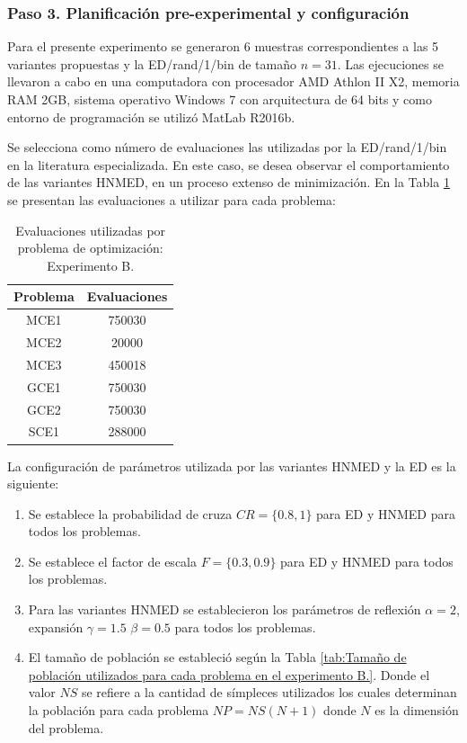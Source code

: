 \subsubsection{Paso 3. Planificación pre-experimental y configuración}
Para el presente experimento se generaron 6 muestras correspondientes a las 5 variantes propuestas y la  ED/rand/1/bin de tamaño $n=31$. Las ejecuciones se llevaron a cabo en una computadora con procesador AMD Athlon II X2, memoria RAM 2GB, sistema operativo Windows 7 con arquitectura de 64 bits y como entorno de programación se utilizó  MatLab R2016b. 

Se selecciona como número de evaluaciones las utilizadas por la ED/rand/1/bin en la literatura especializada. En este caso, se desea observar el comportamiento de las variantes HNMED, en un proceso extenso de minimización. En la Tabla \ref{tab:Evaluaciones utilizadas por problema de optimización: Experimento B.} se presentan las evaluaciones a utilizar para cada problema:

\begin{table}[h]
	\centering
	\caption{Evaluaciones utilizadas por problema de optimización: Experimento B.}
	\label{tab:Evaluaciones utilizadas por problema de optimización: Experimento B.}
	\begin{tabular}{cc}
		\textbf{Problema} &   \textbf{Evaluaciones}     \\
		\hline
		MCE1   &   750030       \\
		MCE2   &   20000       \\
		MCE3   &   450018      \\
		GCE1   &   750030       \\
		GCE2   &   750030      \\
		SCE1   &   288000       \\
	\end{tabular}
\end{table}
La configuración de parámetros utilizada por las variantes HNMED y la ED es la siguiente:
\begin{enumerate}
	\item Se establece la probabilidad de cruza $CR=\{0.8, 1\}$ para ED y HNMED para todos los problemas.
	\item Se establece el factor de escala $F=\{0.3, 0.9\}$ para ED y HNMED para todos los problemas.
	\item Para las variantes HNMED se establecieron los parámetros de reflexión $\alpha=2$, expansión $\gamma=1.5$ $\beta=0.5$ para todos los problemas.
	\item El tamaño de población se estableció según la Tabla \ref{tab:Tamaño de población utilizados para cada problema en el experimento B.}. Donde el valor $NS$ se refiere a la cantidad de símpleces utilizados los cuales determinan la población para cada problema $NP=NS(N+1)$ donde $N$  es la dimensión del problema.
\end{enumerate}

